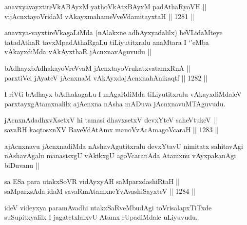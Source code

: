
\begin{shl}
anavxyavayxtireVkABAyxM yathoVkAtxBAyxM padAthaRyoVH ||  \\
vijAcnxtayoVridaM vAkayxmahameVveVdamitayxtaH ||  1281 ||  
\end{shl}

\begin{artha}
anavxya-vayxtireVkagaLiMda (nAlakxne adhAyxyadalilx) heVLidaMteye tatadAthaR tavxMpadAthaRgaLu tiLiyutitxralu anaMtara I `\stext'eMba vAkayxdiMda vAkAyxthaR jAcnxnavAguvudu ||
\end{artha}


\begin{shl}
bAdhayxbAdhakayoVreVvaM jAcnxtayoVrukatxvatamxRnA || \\
parxtiVci jAyateV jAcnxnaM vAkAyxdajAcnxnahAnikaqtf ||  1282 ||  
\end{shl}

\begin{artha}
I riVti bAdhayx bAdhakagaLu I mAgaRdiMda tiLiyutitxralu vAkayxdiMdaleV parxtayxgAtamxnalilx ajAcnxna nAsha mADuva jAcnxnavuMTAguvudu.
\end{artha}

\begin{shl}
jAcnxnAdadhxvXsetxV hi tamasi dhavxsetxV devxYteV saheVtukeV || \\
savaRH kaqtosxnXV BaveVdAtAmx manoVvAcAmagoVcaraH ||  1283 ||  
\end{shl}

\begin{artha}
ajAcnxnavu jAcnxnadiMda nAshavAgutitxralu devxYtavU nimitatx sahitavAgi nAshavAgalu manasisxgU vAkikxgU agoVcaranAda Atamxnu vAyxpakanAgi biDuvanu ||
\end{artha}

\begin{shl}
sa ESa para utakxSoVR vidAyxyAH saMparxdashiRtaH ||  \\
saMparxsAda idaM savaRmAtamxneYvAvashiSayxteV ||  1284 ||  
\end{shl}

\begin{artha}
ideV videyxya paramAvadhi utakxSaRveMbudAgi toVrisalapxTiTxde suSupitxyalilx I jagatetxlalxvU Atamx rUpadiMdale uLiyuvudu.
\end{artha}


